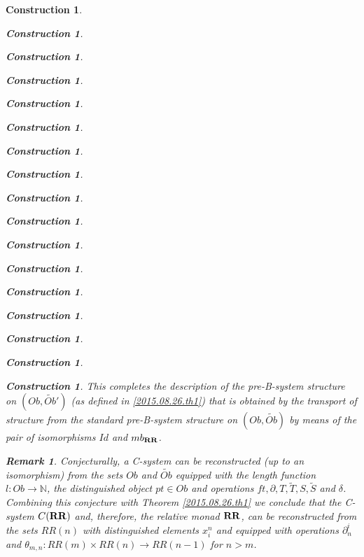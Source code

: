 \documentclass[12pt]{amsart}
\newtheorem{remark}[proposition]{Remark}
\numberwithin{proposition}{subsection}
\newtheorem{construction}[proposition]{Construction}
\newcommand{\llabel}[1]{\label{#1}}
\newcommand{\sr}{\rightarrow}
\newcommand{\nn}{{\mathbb N}}
\newcommand{\wt}{\widetilde}
\newcommand{\RR}{{\bf RR}}
\begin{document}
\begin{construction}
\begin{construction}
\begin{construction}
\begin{construction}
\begin{construction}
\begin{construction}
\begin{construction}
\begin{construction}
\begin{construction}
\begin{construction}
\begin{construction}
\begin{construction}
\begin{construction}
\begin{construction}
\begin{construction}
\begin{construction}
\begin{construction}
This completes the description of the pre-B-system structure on $(Ob,\wt{Ob}')$
(as defined in \ref{2015.08.26.th1})
that is obtained by the transport of structure from the standard pre-B-system
structure on $(Ob,\wt{Ob})$ by means of the pair of isomorphisms $Id$ and
$mb_{\RR}$.
%
\begin{remark}\rm
\llabel{2015.08.29.rem2} 
Conjecturally, a C-system can be reconstructed (up to
an isomorphism) from the sets $Ob$ and $\wt{Ob}$ equipped with the length
function $l:Ob\sr\nn$, the distinguished object $pt\in Ob$ and operations $ft,
\partial, T,\wt{T},S,\wt{S}$ and $\delta$. Combining this conjecture with
Theorem \ref{2015.08.26.th1} we conclude that the C-system $C(\RR)$ and,
therefore, the relative monad $\RR$, can be reconstructed from the sets $RR(n)$
with distinguished elements $x^n_i$ and equipped with operations $\partial_n^i$
and $\theta_{m,n}:RR(m)\times RR(n)\sr RR(n-1)$ for $n>m$.


\end{remark}
\end{construction}
\end{construction}
\end{construction}
\end{construction}
\end{construction}
\end{construction}
\end{construction}
\end{construction}
\end{construction}
\end{construction}
\end{construction}
\end{construction}
\end{construction}
\end{construction}
\end{construction}
\end{construction}
\end{construction}
\end{document}
